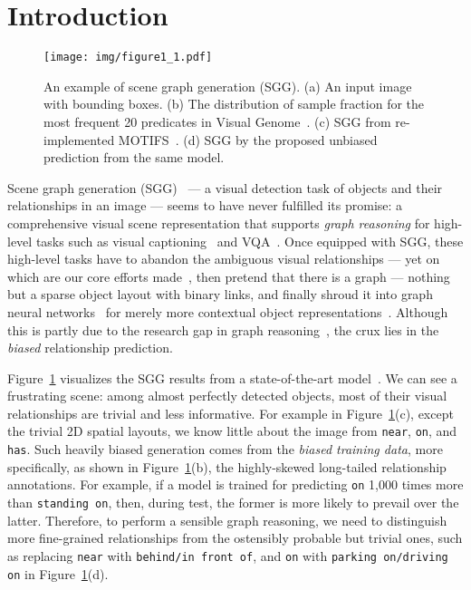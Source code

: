 \documentclass[10pt,twocolumn,letterpaper]{article}
\begin{document}
\section{Introduction}
\label{sec:intro}

\begin{figure}[t]
   \begin{minipage}[b]{1.0\linewidth}
   \centerline{\texttt{[image: img/figure1\_1.pdf]}}
   \end{minipage}
   \caption{An example of scene graph generation (SGG). (a) An input image with bounding boxes. (b) The distribution of sample fraction for the most frequent 20 predicates in Visual Genome~\cite{krishna2017visual}. (c) SGG from re-implemented MOTIFS~\cite{zellers2018neural}. (d) SGG by the proposed unbiased prediction from the same model.}
   \label{fig:1} \vspace{-0.2in}
\end{figure}

Scene graph generation (SGG)~\cite{xu2017scene} --- a visual detection task of objects and their relationships in an image --- seems to have never fulfilled its promise: a comprehensive visual scene representation that supports \emph{graph reasoning} for high-level tasks such as visual captioning~\cite{yao2018exploring, yang2019auto} and VQA~\cite{teney2017graph, hudson2019gqa}. Once equipped with SGG, these high-level tasks have to abandon the ambiguous visual relationships --- yet on which are our core efforts made~\cite{zellers2018neural,tang2019learning,chen2019knowledge}, then pretend that there is a graph --- nothing but a sparse object layout with binary links, and finally shroud it into graph neural networks~\cite{yan2018spatial} for merely more contextual object representations~\cite{yang2019auto, johnson2018image, teney2017graph}. Although this is partly due to the research gap in graph reasoning~\cite{battaglia2018relational, shi2019explainable, hudson2019learning}, the crux lies in the \emph{biased} relationship prediction.

Figure~\ref{fig:1} visualizes the SGG results from a state-of-the-art model~\cite{zellers2018neural}. We can see a frustrating scene: among almost perfectly detected objects, most of their visual relationships are trivial and less informative. For example in Figure~\ref{fig:1}(c), except the trivial 2D spatial layouts, we know little about the image from \texttt{near}, \texttt{on}, and \texttt{has}. Such heavily biased generation comes from the \emph{biased training data}, more specifically, as shown in Figure~\ref{fig:1}(b), the highly-skewed long-tailed relationship annotations. For example, if a model is trained for predicting \texttt{on} 1,000 times more than \texttt{standing on}, then, during test, the former is more likely to prevail over the latter. Therefore, to perform a sensible graph reasoning, we need to distinguish more fine-grained relationships from the ostensibly probable but trivial ones, such as replacing \texttt{near} with \texttt{behind/in front of}, and \texttt{on} with \texttt{parking on/driving on} in Figure~\ref{fig:1}(d). 
\end{document}
